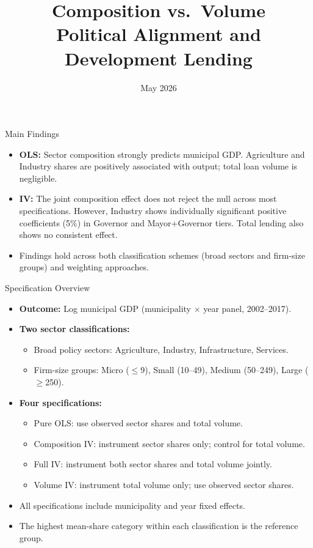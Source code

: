\documentclass[aspectratio=169,11pt]{beamer}
\title{\textbf{Composition vs.\ Volume}\\[0.4em]{\large Political Alignment and Development Lending}}
\date{May 2026}
\begin{document}
\begin{frame}
\titlepage
\end{frame}

\begin{frame}{Main Findings}
\begin{itemize}\setlength{\itemsep}{0.4em}
\item \textbf{OLS:} Sector composition strongly predicts municipal GDP. Agriculture and Industry shares are positively associated with output; total loan volume is negligible.
\item \textbf{IV:} The joint composition effect does not reject the null across most specifications. However, Industry shows individually significant positive coefficients (5\%) in Governor and Mayor+Governor tiers. Total lending also shows no consistent effect.
\item Findings hold across both classification schemes (broad sectors and firm-size groups) and weighting approaches.
\end{itemize}
\end{frame}

\begin{frame}{Specification Overview}
\begin{itemize}\setlength{\itemsep}{0.35em}
\item \textbf{Outcome:} Log municipal GDP (municipality $\times$ year panel, 2002--2017).
\item \textbf{Two sector classifications:}
  \begin{itemize}\setlength{\itemsep}{0.2em}
  \item Broad policy sectors: Agriculture, Industry, Infrastructure, Services.
  \item Firm-size groups: Micro ($\leq$9), Small (10--49), Medium (50--249), Large ($\geq$250).
  \end{itemize}
\item \textbf{Four specifications:}
  \begin{itemize}\setlength{\itemsep}{0.2em}
  \item Pure OLS: use observed sector shares and total volume.
  \item Composition IV: instrument sector shares only; control for total volume.
  \item Full IV: instrument both sector shares and total volume jointly.
  \item Volume IV: instrument total volume only; use observed sector shares.
  \end{itemize}
\item All specifications include municipality and year fixed effects.
\item The highest mean-share category within each classification is the reference group.
\end{itemize}
\end{frame}
\end{document}
